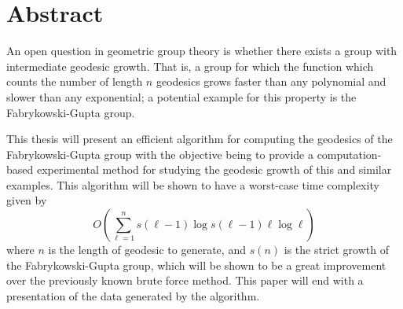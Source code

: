 \chapter*{Abstract}

An open question in geometric group theory is whether there exists a group with intermediate geodesic growth.
That is, a group for which the function which counts the number of length $n$ geodesics grows faster than any polynomial and slower than any exponential; a potential example for this property is the Fabrykowski-Gupta group.

This thesis will present an efficient algorithm for computing the geodesics of the Fabrykowski-Gupta group with the objective being to provide a computation-based experimental method for studying the geodesic growth of this and similar examples.
This algorithm will be shown to have a worst-case time complexity given by
\[
  O\left(
    \sum_{\ell=1}^{n} s(\ell-1) \log s(\ell-1) \ell \log \ell 
  \right)
\]
where $n$ is the length of geodesic to generate, and $s(n)$ is the strict growth of the Fabrykowski-Gupta group, which will be shown to be a great improvement over the previously known brute force method.
This paper will end with a presentation of the data generated by the algorithm.